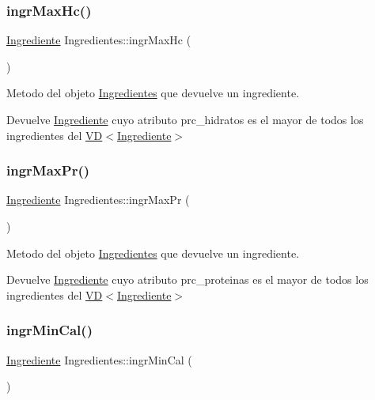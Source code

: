 \subsubsection{\texorpdfstring{ingr\+Max\+Hc()}{ingrMaxHc()}}
{\footnotesize\ttfamily \hyperlink{classIngrediente}{Ingrediente} Ingredientes\+::ingr\+Max\+Hc (\begin{DoxyParamCaption}{ }\end{DoxyParamCaption})}



Metodo del objeto \hyperlink{classIngredientes}{Ingredientes} que devuelve un ingrediente. 

\begin{DoxyReturn}{Devuelve}
\hyperlink{classIngrediente}{Ingrediente} cuyo atributo prc\+\_\+hidratos es el mayor de todos los ingredientes del \hyperlink{classVD}{V\+D$<$\+Ingrediente$>$} 
\end{DoxyReturn}
\mbox{\label{classIngredientes_a2dcc8c985b1ec665a017ada4448aaf96}} 
\subsubsection{\texorpdfstring{ingr\+Max\+Pr()}{ingrMaxPr()}}
{\footnotesize\ttfamily \hyperlink{classIngrediente}{Ingrediente} Ingredientes\+::ingr\+Max\+Pr (\begin{DoxyParamCaption}{ }\end{DoxyParamCaption})}



Metodo del objeto \hyperlink{classIngredientes}{Ingredientes} que devuelve un ingrediente. 

\begin{DoxyReturn}{Devuelve}
\hyperlink{classIngrediente}{Ingrediente} cuyo atributo prc\+\_\+proteinas es el mayor de todos los ingredientes del \hyperlink{classVD}{V\+D$<$\+Ingrediente$>$} 
\end{DoxyReturn}
\mbox{\label{classIngredientes_ac47f94d2dc7085be44be5b434665ba4d}} 
\subsubsection{\texorpdfstring{ingr\+Min\+Cal()}{ingrMinCal()}}
{\footnotesize\ttfamily \hyperlink{classIngrediente}{Ingrediente} Ingredientes\+::ingr\+Min\+Cal (\begin{DoxyParamCaption}{ }\end{DoxyParamCaption})}



